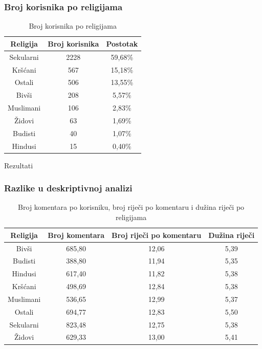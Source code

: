 \documentclass{beamer}
\begin{document}
\begin{frame}
\frametitle{Broj korisnika po religijama}
\begin{table}[h!]
\centering
\caption{Broj korisnika po religijama}
\label{table:dist}
\begin{tabular}{@{}ccc@{}}
\hline
Religija  & Broj korisnika & Postotak \\ 
\hline
\hline
Sekularni & 2228  &  59,68\%                 \\
Kršćani   & 567   & 15,18\%                 \\
Ostali    & 506  & 13,55\% \\
Bivši     & 208  & 5,57\%                   \\
Muslimani & 106  & 2,83\%                   \\
Židovi    & 63   & 1,69\%                  \\
Budisti   & 40   & 1,07\%                  \\
Hindusi   & 15  & 0,40\%                 \\
\hline
\end{tabular}
\end{table}

\end{frame}


\begin{frame}
\begin{center}
\Huge Rezultati
\end{center}
\end{frame}

\begin{frame}
\frametitle{Razlike u deskriptivnoj analizi}

\begin{table}[h!]
\small
\centering
\caption{Broj komentara po korisniku, broj riječi po komentaru i dužina riječi po religijama}
\label{table:desc}
\begin{tabular}{@{}cccc@{}}
\hline
Religija  & Broj komentara & Broj riječi po komentaru & Dužina riječi \\ 
\hline
\hline
Bivši     &  685,80   & 12,06                              & 5,39                    \\
Budisti   &  388,80    & 11,94                              & 5,35                    \\
Hindusi   &  617,40  & 11,82                              & 5,38                   \\
Kršćani   &  498,69   & 12,84                              & 5,38                    \\
Muslimani &  536,65  & 12,99                              & 5,37                    \\
Ostali    &  694,77    & 12,83                              & 5,50                    \\
Sekularni &  823,48  & 12,75                              & 5,38                    \\
Židovi    &  629,33  & 13,00                              & 5,41                    \\

\hline
\end{tabular}
\end{table}
\end{frame}
\end{document}
